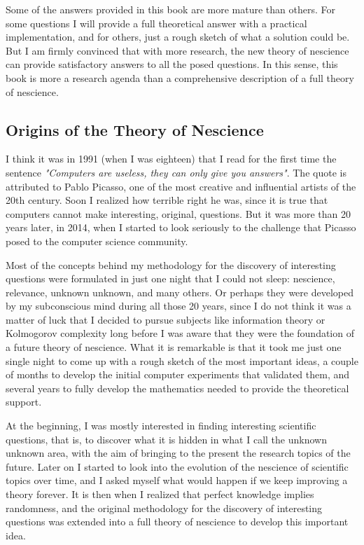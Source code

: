 Some of the answers provided in this book are more mature than others. For some questions I will provide a full theoretical answer with a practical implementation, and for others, just a rough sketch of what a solution could be. But I am firmly convinced that with more research, the new theory of nescience can provide satisfactory answers to all the posed questions. In this sense, this book is more a research agenda than a comprehensive description of a full theory of nescience.

%
%

\subsection*{Origins of the Theory of Nescience}

I think it was in 1991 (when I was eighteen) that I read for the first time the sentence \emph{"Computers are useless, they can only give you answers"}. The quote is attributed to Pablo Picasso, one of the most creative and influential artists of the 20th century. Soon I realized how terrible right he was, since it is true that computers cannot make interesting, original, questions. But it was more than 20 years later, in 2014, when I started to look seriously to the challenge that Picasso posed to the computer science community.

Most of the concepts behind my methodology for the discovery of interesting questions were formulated in just one night that I could not sleep: nescience, relevance, unknown unknown, and many others. Or perhaps they were developed by my subconscious mind during all those 20 years, since I do not think it was a matter of luck that I decided to pursue subjects like information theory or Kolmogorov complexity long before I was aware that they were the foundation of a future theory of nescience. What it is remarkable is that it took me just one single night to come up with a rough sketch of the most important ideas, a couple of months to develop the initial computer experiments that validated them, and several years to fully develop the mathematics needed to provide the theoretical support.

At the beginning, I was mostly interested in finding interesting scientific questions, that is, to discover what it is hidden in what I call the unknown unknown area, with the aim of bringing to the present the research topics of the future. Later on I started to look into the evolution of the nescience of scientific topics over time, and I asked myself what would happen if we keep improving a theory forever. It is then when I realized that perfect knowledge implies randomness, and the original methodology for the discovery of interesting questions was extended into a full theory of nescience to develop this important idea.

